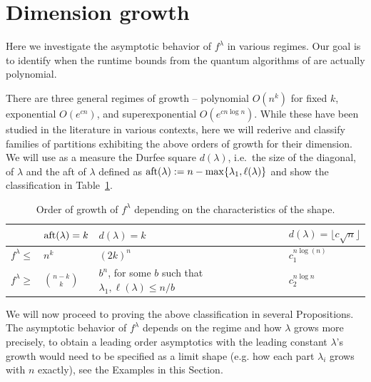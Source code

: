 \documentclass[11pt]{amsart}
\theoremstyle{plain}
\theoremstyle{definition}
\numberwithin{equation}{section}
\newcommand{\la}{\lambda}
\def\la{\lambda}
\begin{document}
\section{Dimension growth}\label{sec:dimension}

Here we investigate the asymptotic behavior of $f^\la$ in various regimes. Our goal is to identify when the runtime bounds from the quantum algorithms of \cite{LH24} are actually polynomial. 

There are three general regimes of growth -- polynomial $O(n^k)$ for fixed $k$, exponential $O(e^{cn})$, and superexponential $O(e^{c n \log n})$. 
While these have been studied in the literature in various contexts, here we will rederive and classify families of partitions exhibiting the above orders of growth for their dimension. We will use as a measure the Durfee square $d(\la)$, i.e.\ the size of the diagonal, of $\lambda$ and the  aft of $\la$ defined as ${\rm aft}(\la):=n-\max\{\la_1,\ell(\la)\}$ and show the classification in Table~\ref{table:growth_order}.
\begin{table}[!h]
\begin{tabular}{|p{1in}|p{1.5in}|p{1.5in}|p{1.5in}|}
\hline 
 & ${\rm aft}(\la)=k$ & $d(\la)=k$ & $d(\la) = \lfloor c \sqrt{n} \rfloor$ \\
\hline
$f^\la\leq $ &  $n^{k}$ & $(2k)^n $ & $c_1^{ n \log(n)}$ \\
\hline
$f^\la \geq$ & $ \binom{n-k}{k} $ & $b^n$, for some $b$ such that $\la_1,\ell(\la) \leq n/b$  & $c_2^{n\log n}$\\
\hline
\end{tabular}
\caption{Order of growth of $f^\la$ depending on the characteristics of the shape.} \label{table:growth_order}
\end{table}

We will now proceed to proving the above classification in several Propositions. The asymptotic behavior of $f^\la$ depends on the regime and how $\la$ grows more precisely, to obtain a leading order asymptotics with the leading constant $\la$'s growth would need to be specified as a limit shape (e.g. how each part $\la_i$ grows with $n$ exactly), see the Examples in this  Section. 
\end{document}

